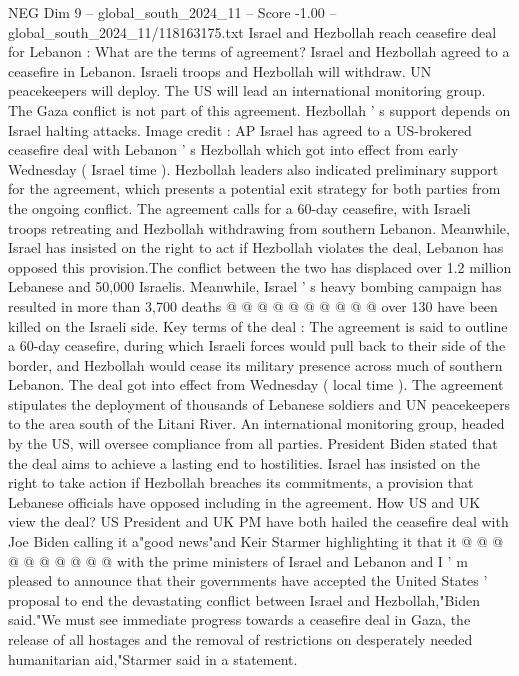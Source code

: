 \begin{textsample}{NEG Dim 9 – global\_south\_2024\_11 – Score -1.00 – global\_south\_2024\_11/118163175.txt}  \label{ex:f9_neg_311}
Israel and Hezbollah reach ceasefire deal for Lebanon : What are the terms of agreement?
Israel and Hezbollah agreed to a ceasefire in Lebanon.
Israeli troops and Hezbollah will withdraw.
UN peacekeepers will deploy.
The US will lead an international monitoring group.
The Gaza conflict is not part of this agreement.
Hezbollah ' s support depends on Israel halting attacks.
Image credit : AP Israel has agreed to a US-brokered ceasefire deal with Lebanon ' s Hezbollah which got into effect from early Wednesday ( Israel time ).
Hezbollah leaders also indicated preliminary support for the agreement, which presents a potential exit strategy for both parties from the ongoing conflict.
The agreement calls for a 60-day ceasefire, with Israeli troops retreating and Hezbollah withdrawing from southern Lebanon.
Meanwhile, Israel has insisted on the right to act if Hezbollah violates the deal, Lebanon has opposed this provision.The conflict between the two has displaced over 1.2 million Lebanese and 50,000 Israelis.
Meanwhile, Israel ' s heavy bombing campaign has resulted in more than 3,700 deaths @ @ @ @ @ @ @ @ @ @ over 130 have been killed on the Israeli side.
Key terms of the deal : The agreement is said to outline a 60-day ceasefire, during which Israeli forces would pull back to their side of the border, and Hezbollah would cease its military presence across much of southern Lebanon.
The deal got into effect from Wednesday ( local time ).
The agreement stipulates the deployment of thousands of Lebanese soldiers and UN peacekeepers to the area south of the Litani River.
An international monitoring group, headed by the US, will oversee compliance from all parties.
President Biden stated that the deal aims to achieve a lasting end to hostilities.
Israel has insisted on the right to take action if Hezbollah breaches its commitments, a provision that Lebanese officials have opposed including in the agreement.
How US and UK view the deal?
US President and UK PM have both hailed the ceasefire deal with Joe Biden calling it a"good news"and Keir Starmer highlighting it that it @ @ @ @ @ @ @ @ @ @ with the prime ministers of Israel and Lebanon and I ' m pleased to announce that their governments have accepted the United States ' proposal to end the devastating conflict between Israel and Hezbollah,"Biden said."We must see immediate progress towards a ceasefire deal in Gaza, the release of all hostages and the removal of restrictions on desperately needed humanitarian aid,"Starmer said in a statement.

\end{textsample}
